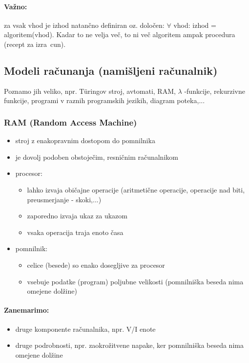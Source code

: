 \documentclass[a4paper,10pt]{article}
\begin{document}
\paragraph{Va\v zno:} za vsak vhod je izhod natan\v cno definiran oz. dolo\v cen: $\forall$ vhod: izhod = algoritem(vhod). Kadar to ne velja ve\v c, to ni ve\v c algoritem ampak procedura (recept za izra\ cun).

\subsection{Modeli ra\v cunanja (nami\v sljeni ra\v cunalnik)}
Poznamo jih veliko, npr. T\"uringov stroj, avtomati, RAM, $\lambda$ -funkcije, rekurzivne funkcije, programi v raznih programskih jezikih, diagram poteka,...

\subsubsection{RAM (Random Access Machine)}
\begin{itemize}
\item stroj z enakopravnim dostopom do pomnilnika
\item je dovolj podoben obstoje\v cim, resni\v cnim ra\v cunalnikom
\item procesor:
\begin{itemize}
	\item lahko izvaja obi\v cajne operacije (aritmeti\v cne operacije, operacije nad biti, preusmerjanje - skoki,...)
	\item zaporedno izvaja ukaz za ukazom
	\item vsaka operacija traja enoto \v casa
	\end{itemize}
\item pomnilnik:
	\begin{itemize}
	\item celice (besede) so enako dosegljive za procesor
	\item vsebuje podatke (program) poljubne velikosti (pomnilni\v ska beseda nima omejene dol\v zine)
	\end{itemize}
\end{itemize}

\paragraph{Zanemarimo:}
\begin{itemize}
\item druge komponente ra\v cunalnika, npr. V/I enote
\item druge podrobnosti, npr. zaokro\v zitvene napake, ker pomnilni\v ska beseda nima omejene dol\v zine
\end{itemize}
\end{document}
